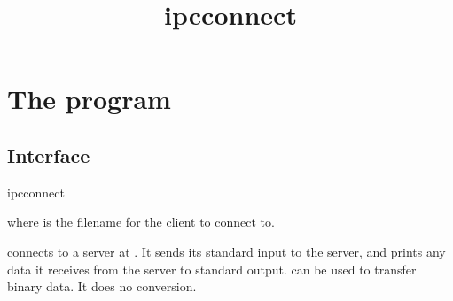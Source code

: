 \documentclass{book}
\title{ipcconnect}
\begin{document}
\section{The  program}

\subsection{Interface}
\begin{code}%
  ipcconnect 
\end{code}
where  is the filename for the client to connect to.

 connects to a server at .  It sends its
standard input to the server, and prints any data it receives from the
server to standard output.   can be used to transfer
binary data.  It does no conversion.
\end{document}
